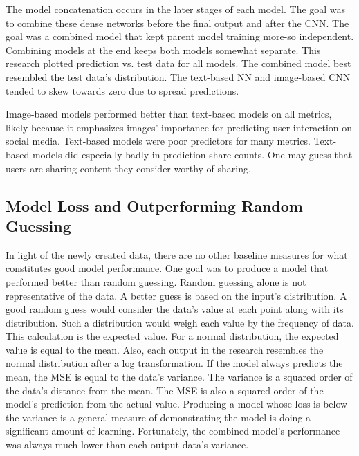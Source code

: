 \documentclass{article}
\begin{document}
The model concatenation occurs in the later stages of each model. The goal was to combine these dense networks before the final output and after the CNN. The goal was a combined model that kept parent model training more-so independent. Combining models at the end keeps both models somewhat separate. This research plotted prediction vs. test data for all models. The combined model best resembled the test data's distribution. The text-based NN and image-based CNN tended to skew towards zero due to spread predictions.

Image-based models performed better than text-based models on all metrics, likely because it emphasizes images' importance for predicting user interaction on social media. Text-based models were poor predictors for many metrics. Text-based models did especially badly in prediction share counts. One may guess that users are sharing content they consider worthy of sharing. 


\subsection{Model Loss and Outperforming Random Guessing}
In light of the newly created data, there are no other baseline measures for what constitutes good model performance. One goal was to produce a model that performed better than random guessing. Random guessing alone is not representative of the data. A better guess is based on the input's distribution. A good random guess would consider the data's value at each point along with its distribution. Such a distribution would weigh each value by the frequency of data. This calculation is the expected value. For a normal distribution, the expected value is equal to the mean. Also, each output in the research resembles the normal distribution after a log transformation. If the model always predicts the mean, the MSE is equal to the data's variance. The variance is a squared order of the data's distance from the mean. The MSE is also a squared order of the model's prediction from the actual value. Producing a model whose loss is below the variance is a general measure of demonstrating the model is doing a significant amount of learning. Fortunately, the combined model's performance was always much lower than each output data's variance.
\end{document}

